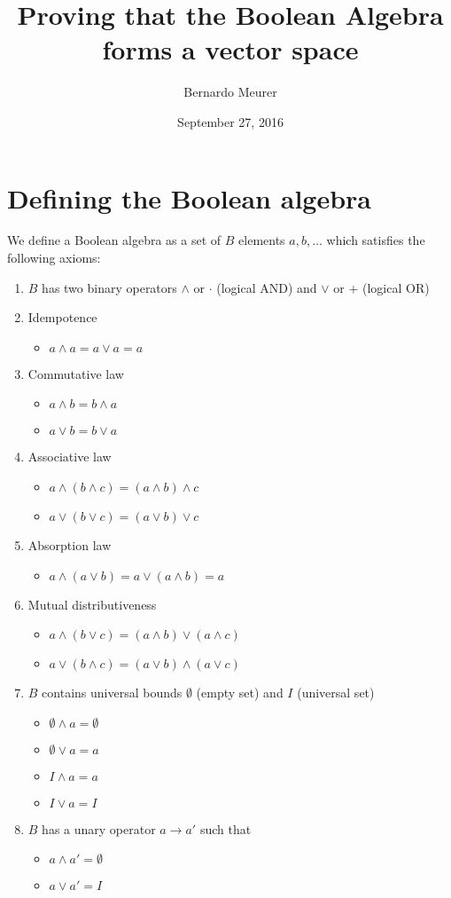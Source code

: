 \documentclass{article}
\title{Proving that the Boolean Algebra forms a vector space}
\date{September 27, 2016}
\author{Bernardo Meurer}
\begin{document}
\maketitle
\newpage
\section{Defining the Boolean algebra}
\label{sec:Defining the Boolean algebra}

We define a Boolean algebra as a set of $B$ elements $a,b,\dots$ which satisfies
the following axioms:

\begin{enumerate}
  \item $B$ has two binary operators $\wedge$ or $\cdot$ (logical AND) and
        $\vee$ or $+$ (logical OR)
  \item Idempotence
  \begin{itemize}
    \item $a\wedge a = a \vee a = a$
  \end{itemize}
  \item Commutative law
  \begin{itemize}
    \item $a \wedge b = b \wedge a$
    \item $a \vee b = b \vee a$
  \end{itemize}
  \item Associative law
  \begin{itemize}
    \item $a \wedge (b \wedge c) = (a \wedge b) \wedge c$
    \item $a \vee (b \vee c) = (a \vee b) \vee c$
  \end{itemize}
  \item Absorption law
  \begin{itemize}
    \item $a \wedge (a \vee b) = a \vee (a \wedge b) = a$
  \end{itemize}
  \item Mutual distributiveness
  \begin{itemize}
    \item $a \wedge (b \vee c) = (a \wedge b) \vee (a \wedge c)$
    \item $a \vee (b \wedge c) = (a \vee b) \wedge (a \vee c)$
  \end{itemize}
  \item $B$ contains universal bounds $\emptyset$ (empty set) and $I$
  (universal set)
  \begin{itemize}
    \item $\emptyset \wedge a = \emptyset$
    \item $\emptyset \vee a = a$
    \item $I \wedge a = a$
    \item $I \vee a = I$
  \end{itemize}
  \item $B$ has a unary operator $a\rightarrow a'$ such that
  \begin{itemize}
    \item $a \wedge a' = \emptyset$
    \item $a \vee a' = I$
  \end{itemize}
\end{enumerate}
\end{document}

